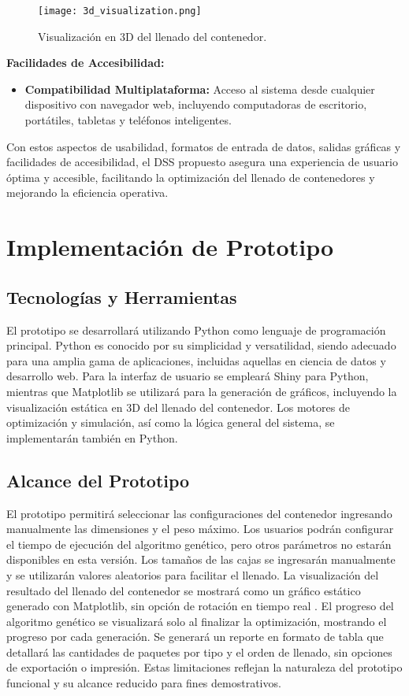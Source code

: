 \documentclass[9pt,a4paper]{rho}
\begin{document}
\begin{figure}[h!]
    \centering
    \texttt{[image: 3d\_visualization.png]}
    \caption{Visualización en 3D del llenado del contenedor.}
    \label{fig:3d_visualization}
\end{figure}

\textbf{Facilidades de Accesibilidad:}
\begin{itemize}
    \item \textbf{Compatibilidad Multiplataforma:} Acceso al sistema desde cualquier dispositivo con navegador web, incluyendo computadoras de escritorio, portátiles, tabletas y teléfonos inteligentes.
\end{itemize}

Con estos aspectos de usabilidad, formatos de entrada de datos, salidas gráficas y facilidades de accesibilidad, el DSS propuesto asegura una experiencia de usuario óptima y accesible, facilitando la optimización del llenado de contenedores y mejorando la eficiencia operativa.

\section{Implementación de Prototipo}

\subsection{Tecnologías y Herramientas}
El prototipo se desarrollará utilizando Python \cite{python-wikipedia} como lenguaje de programación principal. Python es conocido por su simplicidad y versatilidad, siendo adecuado para una amplia gama de aplicaciones, incluidas aquellas en ciencia de datos y desarrollo web. Para la interfaz de usuario se empleará Shiny para Python, mientras que Matplotlib \cite{matplotlib-intro} se utilizará para la generación de gráficos, incluyendo la visualización estática en 3D del llenado del contenedor. Los motores de optimización y simulación, así como la lógica general del sistema, se implementarán también en Python.

\subsection{Alcance del Prototipo}
El prototipo permitirá seleccionar las configuraciones del contenedor ingresando manualmente las dimensiones y el peso máximo. Los usuarios podrán configurar el tiempo de ejecución del algoritmo genético, pero otros parámetros no estarán disponibles en esta versión. Los tamaños de las cajas se ingresarán manualmente y se utilizarán valores aleatorios para facilitar el llenado. La visualización del resultado del llenado del contenedor se mostrará como un gráfico estático generado con Matplotlib, sin opción de rotación en tiempo real . El progreso del algoritmo genético se visualizará solo al finalizar la optimización, mostrando el progreso por cada generación. Se generará un reporte en formato de tabla que detallará las cantidades de paquetes por tipo y el orden de llenado, sin opciones de exportación o impresión. Estas limitaciones reflejan la naturaleza del prototipo funcional y su alcance reducido para fines demostrativos.
\end{document}

